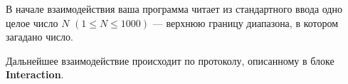 В начале взаимодействия ваша программа читает из стандартного ввода одно целое число $N$ $(1 \le N \le 1000)$ --- верхнюю границу диапазона, в котором загадано число.

Дальнейшее взаимодействие происходит по протоколу, описанному в блоке \textbf{Interaction}.

